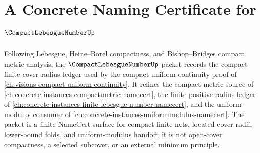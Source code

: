 \chapter{A Concrete Naming Certificate for $\CompactLebesgueNumberUp$}
\label{ch:concrete-instances-compact-lebesgue-number-namecert}

Following Lebesgue, Heine--Borel compactness, and Bishop--Bridges compact metric analysis, the $\CompactLebesgueNumberUp$ packet records the compact finite cover-radius ledger used by the compact uniform-continuity proof of \autoref{ch:visions-compact-uniform-continuity}. It refines the compact-metric source of \autoref{ch:concrete-instances-compactmetric-namecert}, the finite positive-radius ledger of \autoref{ch:concrete-instances-finite-lebesgue-number-namecert}, and the uniform-modulus consumer of \autoref{ch:concrete-instances-uniformmodulus-namecert}. The packet is a finite NameCert surface for compact finite nets, located cover radii, lower-bound folds, and uniform-modulus handoff; it is not open-cover compactness, a selected subcover, or an external minimum principle.

